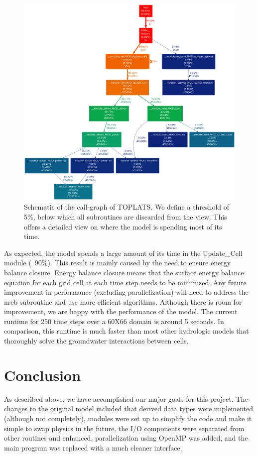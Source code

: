 \documentclass[pdftex,12pt,a4paper]{article}
\begin{document}
\begin{figure}[h]
	\includegraphics[width=5.0in]{Figures/CallGraph.png}

	\caption{Schematic of the call-graph of TOPLATS. We define a threshold of 5\%, below which all subroutines are discarded from the view. This offers a detailed view on where the model is spending most of its time.}
	\label{Profiling1}
\end{figure}

As expected, the model spends a large amount of its time in the Update\_Cell module (~90\%). This result is mainly caused by the need to ensure energy balance closure. Energy balance closure means that the surface energy balance equation for each grid cell at each time step needs to be minimized. Any future improvement in performance (excluding parallelization) will need to address the nreb subroutine and use more efficient algorithms. Although there is room for improvement, we are happy with the performance of the model. The current runtime for 250 time steps over a 60X66 domain is around 5 seconds. In comparison, this runtime is much faster than most other hydrologic models that thoroughly solve the groundwater interactions between cells.

\section{Conclusion}

As described above, we have accomplished our major goals for this project. The changes to the original model included that derived data types were implemented (although not completely), modules were set up to simplify the code and make it simple to swap physics in the future, the I/O components were separated from other routines and enhanced, parallelization using OpenMP was added, and the main program was replaced with a much cleaner interface. 
\end{document}
